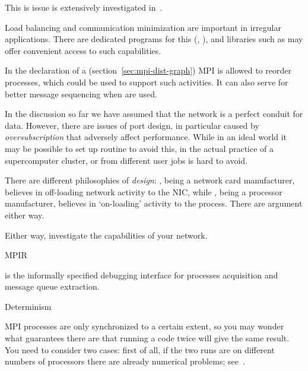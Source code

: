 This is issue is extensively investigated in~\cite{Eijkhout:MPItype-arxiv}.


Load balancing and communication minimization are important in
irregular applications. There are dedicated programs for this
(, ), and libraries such as
 may offer convenient access to such capabilities.

In the declaration of a 
  (section~\ref{sec:mpi-dist-graph}) MPI is allowed to
reorder processes, which could be used to support such activities.
It can also serve for better message sequencing when
 are used.


In the discussion so far we have assumed that the network is a perfect
conduit for data. However, there are issues of port design, in
particular caused by
\emph{oversubscription} that
adversely affect performance. While in an ideal world it may be
possible to set up routine to avoid this, in the actual practice of a
supercomputer cluster,  or
 from
different user jobs is hard to avoid.


There are different philosophies of 
\emph{design}: , being a network card manufacturer,
believes in off-loading network activity to the \ac{NIC}, while
, being a processor manufacturer, believes in
`on-loading' activity to the process. There are argument either way.

Either way, investigate the capabilities of your network.

 {MPIR}

 is the informally specified debugging interface
for processes acquisition and message queue extraction.

 {Determinism}
\label{sec:mpi-semantics}

MPI processes are only synchronized to a certain extent, so you may
wonder what guarantees there are that running a code twice will give
the same result.  You need to consider two cases: first of all, if the
two runs are on different numbers of processors there are already
numerical problems; see~.

